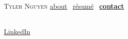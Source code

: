 \documentclass{article}
\begin{document}
\begin{preview}
\noindent \textsc{\Huge Tyler Nguyen} {\large \quad \href{about.pdf}{about} \ \href{resume.pdf}{r\'esum\'e} \ \href{contact.pdf}{\textbf{\textbullet contact}}}

\noindent\dotfill\\

\href{http://www.linkedin.com/in/tneilnguyen}{LinkedIn}
\end{preview}
\end{document}
